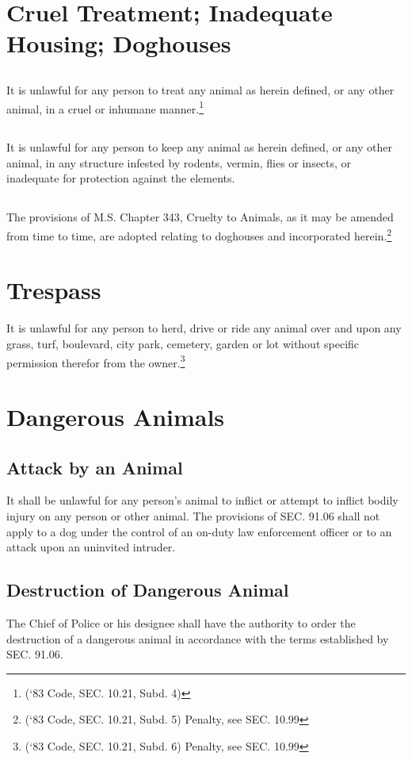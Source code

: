 \section{Cruel Treatment; Inadequate Housing; Doghouses}
\subsection{}
It is unlawful for any person to treat any animal as herein defined, or any other animal, in a cruel or inhumane manner.\footnote{(‘83 Code, SEC. 10.21, Subd. 4)}
\subsection{}
It is unlawful for any person to keep any animal as herein defined, or any other animal, in any structure infested by rodents, vermin, flies or insects, or inadequate for protection against the elements.
\subsection{}
The provisions of M.S. Chapter 343, Cruelty to Animals, as it may be amended from time to time, are adopted relating to doghouses and incorporated herein.\footnote{(‘83 Code, SEC. 10.21, Subd. 5)  Penalty, see SEC. 10.99}

\section{Trespass}
It is unlawful for any person to herd, drive or ride any animal over and upon any grass, turf, boulevard, city park, cemetery, garden or lot without specific permission therefor from the owner.\footnote{(‘83 Code, SEC. 10.21, Subd. 6)  Penalty, see SEC. 10.99}

\section{Dangerous Animals}
\subsection{Attack by an Animal}
It shall be unlawful for any person’s animal to inflict or attempt to inflict bodily injury on any person or other animal. The provisions of SEC. 91.06 shall not apply to a dog under the control of an on-duty law enforcement officer or to an attack upon an uninvited intruder.
\subsection{Destruction of Dangerous Animal}
The Chief of Police or his designee shall have the authority to order the destruction of a dangerous animal in accordance with the terms established by SEC. 91.06.
